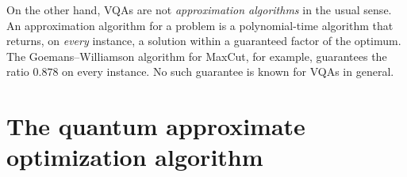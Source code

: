\documentclass[handoutsbeamer.tex]{subfiles}
\begin{document}
\begin{frame}
On the other hand, VQAs are not \emph{approximation algorithms} in the usual sense. An approximation algorithm for a problem is a polynomial-time algorithm that returns, on \emph{every} instance, a solution within a guaranteed factor of the optimum. The Goemans--Williamson algorithm for MaxCut, for example, guarantees the ratio $0.878$ on every instance. No such guarantee is known for VQAs in general.

\end{frame}

\section{The quantum approximate optimization algorithm}\label{sec:ch05:qaoa}
\end{document}

